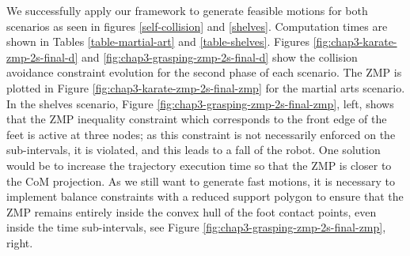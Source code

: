 We successfully apply our framework to generate feasible motions for
both scenarios as seen in figures \ref{self-collision} and
\ref{shelves}. Computation times are shown in Tables
\ref{table-martial-art} and \ref{table-shelves}. Figures
\ref{fig:chap3-karate-zmp-2s-final-d} and
\ref{fig:chap3-grasping-zmp-2s-final-d} show the collision avoidance
constraint evolution for the second phase of each scenario. The ZMP is
plotted in Figure \ref{fig:chap3-karate-zmp-2s-final-zmp} for the
martial arts scenario. In the shelves scenario, Figure
\ref{fig:chap3-grasping-zmp-2s-final-zmp}, left, shows that the ZMP
inequality constraint which corresponds to the front edge of the feet
is active at three nodes; as this constraint is not necessarily
enforced on the sub-intervals, it is violated, and this leads to a
fall of the robot. One solution would be to increase the trajectory
execution time so that the ZMP is closer to the CoM projection. As we
still want to generate fast motions, it is necessary to implement
balance constraints with a reduced support polygon to ensure that the
ZMP remains entirely inside the convex hull of the foot contact
points, even inside the time sub-intervals, see Figure
\ref{fig:chap3-grasping-zmp-2s-final-zmp}, right.

